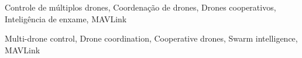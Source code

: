 \documentclass[portuguese]{sbcreviews-2025}
\begin{document}
\begin{frontmatter}
\begin{pchaves}
Controle de múltiplos drones, Coordenação de drones, Drones cooperativos, Inteligência de enxame, MAVLink
\end{pchaves}

\begin{keywords}
Multi-drone control, Drone coordination, Cooperative drones, Swarm intelligence, MAVLink
\end{keywords}




\end{frontmatter}










\end{document}
